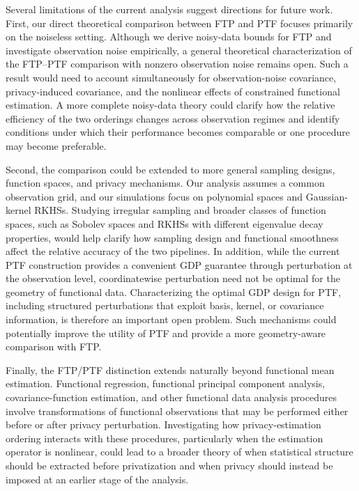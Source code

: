 \documentclass[twoside,11pt]{article}
\begin{document}
Several limitations of the current analysis suggest directions for future work. First, our direct theoretical comparison between FTP and PTF focuses primarily on the noiseless setting. Although we derive noisy-data bounds for FTP and investigate observation noise empirically, a general theoretical characterization of the FTP--PTF comparison with nonzero observation noise remains open. Such a result would need to account simultaneously for observation-noise covariance, privacy-induced covariance, and the nonlinear effects of constrained functional estimation. A more complete noisy-data theory could clarify how the relative efficiency of the two orderings changes across observation regimes and identify conditions under which their performance becomes comparable or one procedure may become preferable.

Second, the comparison could be extended to more general sampling designs, function spaces, and privacy mechanisms. Our analysis assumes a common observation grid, and our simulations focus on polynomial spaces and Gaussian-kernel RKHSs. Studying irregular sampling and broader classes of function spaces, such as Sobolev spaces and RKHSs with different eigenvalue decay properties, would help clarify how sampling design and functional smoothness affect the relative accuracy of the two pipelines. In addition, while the current PTF construction provides a convenient GDP guarantee through perturbation at the observation level, coordinatewise perturbation need not be optimal for the geometry of functional data. Characterizing the optimal GDP design for PTF, including structured perturbations that exploit basis, kernel, or covariance information, is therefore an important open problem. Such mechanisms could potentially improve the utility of PTF and provide a more geometry-aware comparison with FTP.

Finally, the FTP/PTF distinction extends naturally beyond functional mean estimation. Functional regression, functional principal component analysis, covariance-function estimation, and other functional data analysis procedures involve transformations of functional observations that may be performed either before or after privacy perturbation. Investigating how privacy-estimation ordering interacts with these procedures, particularly when the estimation operator is nonlinear, could lead to a broader theory of when statistical structure should be extracted before privatization and when privacy should instead be imposed at an earlier stage of the analysis.
\end{document}
